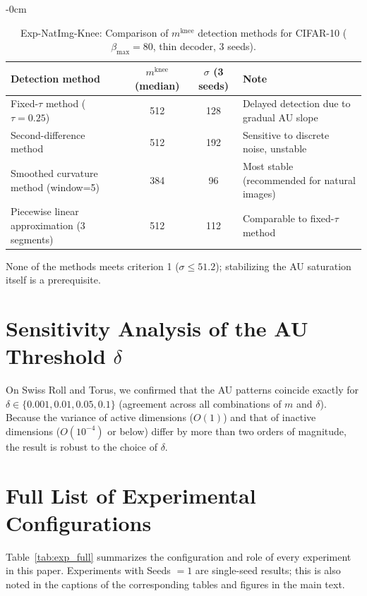 \documentclass[make,article,submit,pdftex,moreauthors]{Definitions/mdpi}
\newcommand{\mknee}{m^{\mathrm{knee}}}
\begin{document}
\begin{table}[H]
\begin{adjustwidth}{-\extralength}{0cm}
\centering
\caption{Exp-NatImg-Knee: Comparison of $\mknee$ detection methods for CIFAR-10 ($\beta_\mathrm{max}=80$, thin decoder, 3 seeds).}
\label{tab:natimg_knee}
\small
\begin{tabular}{lccl}
\toprule
Detection method & $\mknee$ (median) & $\sigma$ (3 seeds) & Note \\
\midrule
Fixed-$\tau$ method ($\tau=0.25$) & 512 & 128 & Delayed detection due to gradual AU slope \\
Second-difference method & 512 & 192 & Sensitive to discrete noise, unstable \\
Smoothed curvature method (window=5) & 384 & 96 & Most stable (recommended for natural images) \\
Piecewise linear approximation (3 segments) & 512 & 112 & Comparable to fixed-$\tau$ method \\
\bottomrule
\end{tabular}
\end{adjustwidth}
\end{table}

None of the methods meets criterion 1 ($\sigma \leq 51.2$); stabilizing the AU saturation itself is a prerequisite.

\section[\appendixname~\thesection]{Sensitivity Analysis of the AU Threshold $\delta$}\label{app:delta}

On Swiss Roll and Torus, we confirmed that the AU patterns coincide exactly for
$\delta \in \{0.001, 0.01, 0.05, 0.1\}$ (agreement across all combinations of $m$ and $\delta$).
Because the variance of active dimensions ($O(1)$) and that of inactive dimensions ($O(10^{-4})$ or below)
differ by more than two orders of magnitude, the result is robust to the choice of $\delta$.

\section[\appendixname~\thesection]{Full List of Experimental Configurations}\label{app:exp_table}

Table~\ref{tab:exp_full} summarizes the configuration and role of every experiment in
this paper.
Experiments with Seeds $=1$ are single-seed results; this is also noted in the captions
of the corresponding tables and figures in the main text.
\end{document}
